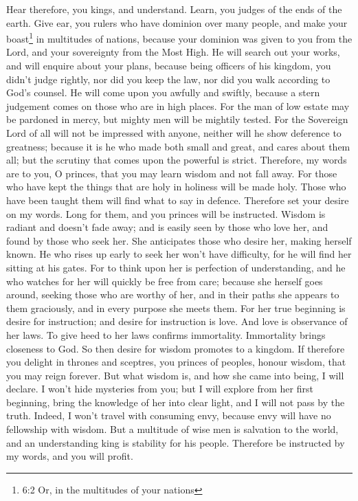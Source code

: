  Hear therefore, you kings, and understand. Learn, you
judges of the ends of the earth.  Give ear, you rulers who
have dominion over many people, and make your boast\footnote{6:2 Or, in
  the multitudes of your nations} in multitudes of nations, 
because your dominion was given to you from the Lord, and your
sovereignty from the Most High. He will search out your works, and will
enquire about your plans,  because being officers of his
kingdom, you didn't judge rightly, nor did you keep the law, nor did you
walk according to God's counsel.  He will come upon you
awfully and swiftly, because a stern judgement comes on those who are in
high places.  For the man of low estate may be pardoned in
mercy, but mighty men will be mightily tested.  For the
Sovereign Lord of all will not be impressed with anyone, neither will he
show deference to greatness; because it is he who made both small and
great, and cares about them all;  but the scrutiny that
comes upon the powerful is strict.  Therefore, my words are
to you, O princes, that you may learn wisdom and not fall away.
 For those who have kept the things that are holy in
holiness will be made holy. Those who have been taught them will find
what to say in defence.  Therefore set your desire on my
words. Long for them, and you princes will be instructed. 
Wisdom is radiant and doesn't fade away; and is easily seen by those who
love her, and found by those who seek her.  She anticipates
those who desire her, making herself known.  He who rises
up early to seek her won't have difficulty, for he will find her sitting
at his gates.  For to think upon her is perfection of
understanding, and he who watches for her will quickly be free from
care;  because she herself goes around, seeking those who
are worthy of her, and in their paths she appears to them graciously,
and in every purpose she meets them.  For her true
beginning is desire for instruction; and desire for instruction is love.
 And love is observance of her laws. To give heed to her
laws confirms immortality.  Immortality brings closeness to
God.  So then desire for wisdom promotes to a kingdom.
 If therefore you delight in thrones and sceptres, you
princes of peoples, honour wisdom, that you may reign forever.
 But what wisdom is, and how she came into being, I will
declare. I won't hide mysteries from you; but I will explore from her
first beginning, bring the knowledge of her into clear light, and I will
not pass by the truth.  Indeed, I won't travel with
consuming envy, because envy will have no fellowship with wisdom.
 But a multitude of wise men is salvation to the world, and
an understanding king is stability for his people. 
Therefore be instructed by my words, and you will profit.

